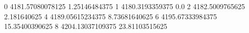 0 4181.57080078125 1.25146484375
1 4180.3193359375 0.0
2 4182.5009765625 2.181640625
4 4189.05615234375 8.73681640625
6 4195.67333984375 15.35400390625
8 4204.13037109375 23.81103515625
